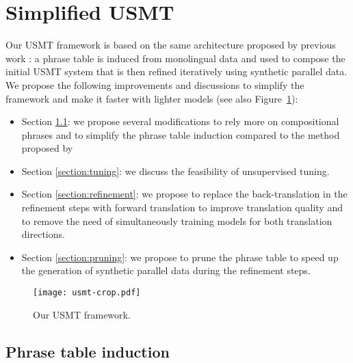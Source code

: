 \documentclass[11pt,a4paper]{article}
\begin{document}
\section{Simplified USMT}
Our USMT framework is based on the same architecture proposed by previous work \citep{artetxe2018unsupervised,DBLP:journals/corr/abs-1804-07755}: a phrase table is induced from monolingual data and used to compose the initial USMT system that is then refined iteratively using synthetic parallel data. We propose the following improvements and discussions to simplify the framework and make it faster with lighter models (see also Figure~\ref{fig:usmt}):
\begin{itemize}\itemsep=0mm
\item Section \ref{section:ipt}: we propose several modifications to rely more on compositional phrases and to simplify the phrase table induction compared to the method proposed by \citet{artetxe2018unsupervised}
\item Section \ref{section:tuning}: we discuss the feasibility of unsupervised tuning.
\item Section \ref{section:refinement}: we propose to replace the back-translation in the refinement steps with forward translation to improve translation quality and to remove the need of simultaneously training models for both translation directions.
\item Section \ref{section:pruning}: we propose to prune the phrase table to speed up the generation of synthetic parallel data during the refinement steps.
\end{itemize}

\begin{figure}[t]
    \centering
            \texttt{[image: usmt-crop.pdf]}
    \caption{\label{fig:usmt} Our USMT framework.}
\end{figure}

\subsection{Phrase table induction}
\label{section:ipt}
\end{document}
